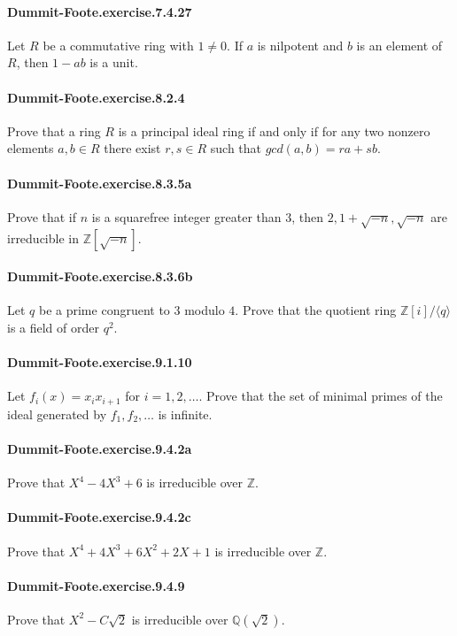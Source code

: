 \documentclass{article}
\begin{document}
\paragraph{Dummit-Foote.exercise.7.4.27} Let $R$ be a commutative ring with $1\neq 0$. If $a$ is nilpotent and $b$ is an element of $R$, then $1-ab$ is a unit.

\paragraph{Dummit-Foote.exercise.8.2.4} Prove that a ring $R$ is a principal ideal ring if and only if for any two nonzero elements $a, b\in R$ there exist $r, s\in R$ such that $gcd(a, b) = ra + sb$.

\paragraph{Dummit-Foote.exercise.8.3.5a} Prove that if $n$ is a squarefree integer greater than $3$, then $2, 1+\sqrt{-n}, \sqrt{-n}$ are irreducible in $\mathbb{Z}[\sqrt{-n}]$.

\paragraph{Dummit-Foote.exercise.8.3.6b} Let $q$ be a prime congruent to $3$ modulo $4$. Prove that the quotient ring $\mathbb{Z}[i]/\langle q\rangle$ is a field of order $q^2$.

\paragraph{Dummit-Foote.exercise.9.1.10} Let $f_i(x)=x_ix_{i+1}$ for $i=1, 2, \dots$. Prove that the set of minimal primes of the ideal generated by $f_1, f_2, \dots$ is infinite.

\paragraph{Dummit-Foote.exercise.9.4.2a} Prove that $X^4 - 4X^3 + 6$ is irreducible over $\mathbb{Z}$.

\paragraph{Dummit-Foote.exercise.9.4.2c} Prove that $X^4 + 4X^3 + 6X^2 + 2X + 1$ is irreducible over $\mathbb{Z}$.

\paragraph{Dummit-Foote.exercise.9.4.9} Prove that $X^2-C\sqrt{2}$ is irreducible over $\mathbb{Q}(\sqrt{2})$.
\end{document}

